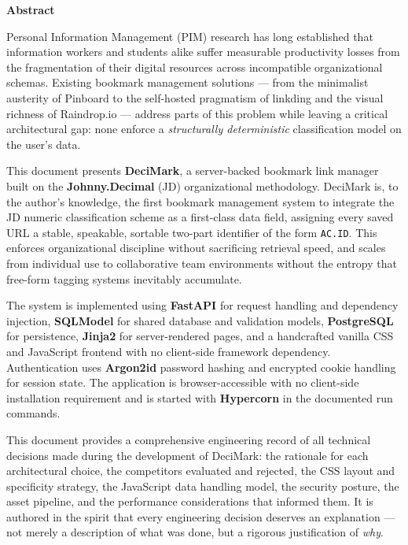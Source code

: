 \documentclass[11pt,a4paper]{book}
\begin{document}
\thispagestyle{empty}
\begin{center}
  {\Large\bfseries Abstract\\[1em]}
\end{center}

Personal Information Management (PIM) research has long established that information workers and students alike suffer measurable productivity losses from the fragmentation of their digital resources across incompatible organizational schemas. Existing bookmark management solutions --- from the minimalist austerity of Pinboard to the self-hosted pragmatism of linkding and the visual richness of Raindrop.io --- address parts of this problem while leaving a critical architectural gap: none enforce a \textit{structurally deterministic} classification model on the user's data.

This document presents \textbf{DeciMark}, a server-backed bookmark link manager built on the \textbf{Johnny.Decimal} (JD) organizational methodology. DeciMark is, to the author's knowledge, the first bookmark management system to integrate the JD numeric classification scheme as a first-class data field, assigning every saved URL a stable, speakable, sortable two-part identifier of the form \texttt{AC.ID}. This enforces organizational discipline without sacrificing retrieval speed, and scales from individual use to collaborative team environments without the entropy that free-form tagging systems inevitably accumulate.

The system is implemented using \textbf{FastAPI} for request handling and dependency injection, \textbf{SQLModel} for shared database and validation models, \textbf{PostgreSQL} for persistence, \textbf{Jinja2} for server-rendered pages, and a handcrafted vanilla CSS and JavaScript frontend with no client-side framework dependency. Authentication uses \textbf{Argon2id} password hashing and encrypted cookie handling for session state. The application is browser-accessible with no client-side installation requirement and is started with \textbf{Hypercorn} in the documented run commands.

This document provides a comprehensive engineering record of all technical decisions made during the development of DeciMark: the rationale for each architectural choice, the competitors evaluated and rejected, the CSS layout and specificity strategy, the JavaScript data handling model, the security posture, the asset pipeline, and the performance considerations that informed them. It is authored in the spirit that every engineering decision deserves an explanation --- not merely a description of what was done, but a rigorous justification of \textit{why}.
\end{document}
